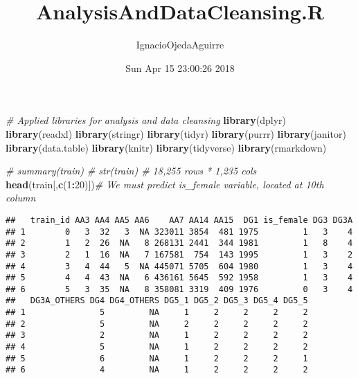 \documentclass[ignorenonframetext,]{beamer}
\title{AnalysisAndDataCleansing.R}
\author{IgnacioOjedaAguirre}
\date{Sun Apr 15 23:00:26 2018}
\newenvironment{Shaded}{\begin{snugshade}}{\end{snugshade}}
\newcommand{\KeywordTok}[1]{\textcolor[rgb]{0.13,0.29,0.53}{\textbf{#1}}}
\newcommand{\DecValTok}[1]{\textcolor[rgb]{0.00,0.00,0.81}{#1}}
\newcommand{\StringTok}[1]{\textcolor[rgb]{0.31,0.60,0.02}{#1}}
\newcommand{\CommentTok}[1]{\textcolor[rgb]{0.56,0.35,0.01}{\textit{#1}}}
\newcommand{\OperatorTok}[1]{\textcolor[rgb]{0.81,0.36,0.00}{\textbf{#1}}}
\newcommand{\NormalTok}[1]{#1}
\begin{document}
\frame{\titlepage}

\begin{frame}[fragile]

\begin{Shaded}
\begin{Highlighting}[]
\CommentTok{# Applied libraries for analysis and data cleansing}
\KeywordTok{library}\NormalTok{(dplyr)}
\KeywordTok{library}\NormalTok{(readxl)}
\KeywordTok{library}\NormalTok{(stringr)}
\KeywordTok{library}\NormalTok{(tidyr)}
\KeywordTok{library}\NormalTok{(purrr)}
\KeywordTok{library}\NormalTok{(janitor)}
\KeywordTok{library}\NormalTok{(data.table)}
\KeywordTok{library}\NormalTok{(knitr)}
\KeywordTok{library}\NormalTok{(tidyverse)}
\KeywordTok{library}\NormalTok{(rmarkdown)}

\CommentTok{# summary(train)}
\CommentTok{# str(train) # 18,255 rows * 1,235 cols}
\KeywordTok{head}\NormalTok{(train[,}\KeywordTok{c}\NormalTok{(}\DecValTok{1}\OperatorTok{:}\DecValTok{20}\NormalTok{)])}\CommentTok{# We must predict is_female variable, located at 10th column}
\end{Highlighting}
\end{Shaded}

\begin{verbatim}
##   train_id AA3 AA4 AA5 AA6    AA7 AA14 AA15  DG1 is_female DG3 DG3A
## 1        0   3  32   3  NA 323011 3854  481 1975         1   3    4
## 2        1   2  26  NA   8 268131 2441  344 1981         1   8    4
## 3        2   1  16  NA   7 167581  754  143 1995         1   3    2
## 4        3   4  44   5  NA 445071 5705  604 1980         1   3    4
## 5        4   4  43  NA   6 436161 5645  592 1958         1   3    4
## 6        5   3  35  NA   8 358081 3319  409 1976         0   3    4
##   DG3A_OTHERS DG4 DG4_OTHERS DG5_1 DG5_2 DG5_3 DG5_4 DG5_5
## 1               5         NA     1     2     2     2     2
## 2               5         NA     2     2     2     2     2
## 3               2         NA     1     2     2     2     2
## 4               5         NA     1     2     2     2     2
## 5               6         NA     1     2     2     2     1
## 6               4         NA     1     2     2     2     2
\end{verbatim}

\begin{Shaded}
\end{Shaded}


\end{frame}
\end{document}
